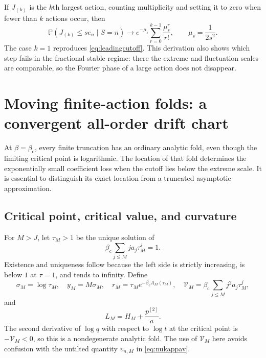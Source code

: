 \documentclass[11pt,a4paper]{article}
\numberwithin{equation}{section}
\theoremstyle{definition}
\theoremstyle{remark}
\newcommand{\Prob}{\mathbb P}
\newcommand{\bc}{\beta_{\mathrm c}}
\begin{document}
If $J_{(k)}$ is the $k$th largest action, counting multiplicity and setting
it to zero when fewer than $k$ actions occur, then
\begin{equation}\label{eq:kth}
 \Prob(J_{(k)}\le se_n\mid S=n)
 \longrightarrow e^{-\mu_s}\sum_{r=0}^{k-1}\frac{\mu_s^r}{r!},
 \qquad \mu_s=\frac1{2s^2}.
\end{equation}
The case $k=1$ reproduces \eqref{eq:leadingcutoff}. This derivation also
shows which step fails in the fractional stable regime: there the extreme
and fluctuation scales are comparable, so the Fourier phase of a large
action does not disappear.

\section{Moving finite-action folds: a convergent all-order drift chart}
\label{sec:folds}

At $\beta=\bc$, every finite truncation has an ordinary analytic fold,
even though the limiting critical point is logarithmic. The location of
that fold determines the exponentially small coefficient loss when the
cutoff lies below the extreme scale. It is essential to distinguish its
exact location from a truncated asymptotic approximation.

\subsection{Critical point, critical value, and curvature}
For $M>J$, let $\tau_M>1$ be the unique solution of
\begin{equation}\label{eq:taudef}
 \bc\sum_{j\le M}j a_j\tau_M^j=1.
\end{equation}
Existence and uniqueness follow because the left side is strictly
increasing, is below $1$ at $\tau=1$, and tends to infinity. Define
\begin{equation}\label{eq:folddefs}
 \sigma_M=\log\tau_M,\quad y_M=M\sigma_M,\quad
 r_M=\tau_M e^{-\bc A_M(\tau_M)},\quad
 \mathcal V_M=\bc\sum_{j\le M}j^2a_j\tau_M^j,
\end{equation}
and
\begin{equation}\label{eq:LM}
 L_M=H_M+\frac{p^{[2]}}a.
\end{equation}
The second derivative of $\log q$ with respect to $\log t$ at the
critical point is $-\mathcal V_M<0$, so this is a nondegenerate analytic
fold. The use of $\mathcal V_M$ here avoids confusion with the untilted
quantity $v_{n,M}$ in \eqref{eq:nukappav}.
\end{document}

